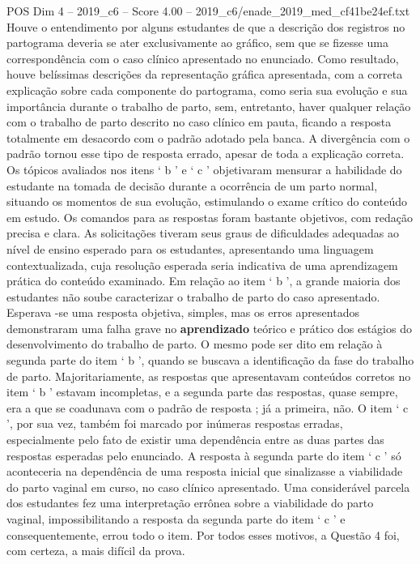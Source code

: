 \begin{textsample}{POS Dim 4 – 2019\_c6 – Score 4.00 – 2019\_c6/enade\_2019\_med\_cf41be24ef.txt}
Houve o entendimento por alguns estudantes de que a descrição dos registros no partograma deveria se ater exclusivamente ao gráfico, sem que se fizesse uma correspondência com o caso clínico apresentado no enunciado.
Como resultado, houve belíssimas descrições da representação gráfica apresentada, com a correta explicação sobre cada componente do partograma, como seria sua evolução e sua importância durante o trabalho de parto, sem, entretanto, haver qualquer relação com o trabalho de parto descrito no caso clínico em pauta, ficando a resposta totalmente em desacordo com o padrão adotado pela banca.
A divergência com o padrão tornou esse tipo de resposta errado, apesar de toda a explicação correta.
Os tópicos avaliados nos itens ‘ b ’ e ‘ c ’ objetivaram mensurar a habilidade do estudante na tomada de decisão durante a ocorrência de um parto normal, situando os momentos de sua evolução, estimulando o exame crítico do conteúdo em estudo.
Os comandos para as respostas foram bastante objetivos, com redação precisa e clara.
As solicitações tiveram seus graus de dificuldades adequadas ao nível de ensino esperado para os estudantes, apresentando uma linguagem contextualizada, cuja resolução esperada seria indicativa de uma aprendizagem prática do conteúdo examinado.
Em relação ao item ‘ b ’, a grande maioria dos estudantes não soube caracterizar o trabalho de parto do caso apresentado.
Esperava -se uma resposta objetiva, simples, mas os erros apresentados demonstraram uma falha grave no \textbf{aprendizado} teórico e prático dos estágios do desenvolvimento do trabalho de parto.
O mesmo pode ser dito em relação à segunda parte do item ‘ b ’, quando se buscava a identificação da fase do trabalho de parto.
Majoritariamente, as respostas que apresentavam conteúdos corretos no item ‘ b ’ estavam incompletas, e a segunda parte das respostas, quase sempre, era a que se coadunava com o padrão de resposta ; já a primeira, não.
O item ‘ c ’, por sua vez, também foi marcado por inúmeras respostas erradas, especialmente pelo fato de existir uma dependência entre as duas partes das respostas esperadas pelo enunciado.
A resposta à segunda parte do item ‘ c ’ só aconteceria na dependência de uma resposta inicial que sinalizasse a viabilidade do parto vaginal em curso, no caso clínico apresentado.
Uma considerável parcela dos estudantes fez uma interpretação errônea sobre a viabilidade do parto vaginal, impossibilitando a resposta da segunda parte do item ‘ c ’ e consequentemente, errou todo o item.
Por todos esses motivos, a Questão 4 foi, com certeza, a mais difícil da prova.

\end{textsample}

